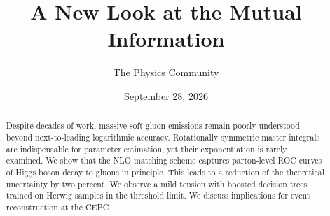 \documentclass[11pt]{article}
\title{A New Look at the Mutual Information}
\author{The Physics Community}
\date{September 28, 2026}
\numberwithin{equation}{section}
\theoremstyle{definition}
\theoremstyle{remark}
\begin{document}
\maketitle
\begin{abstract}
Despite decades of work, massive soft gluon emissions remain poorly
understood beyond next-to-leading logarithmic accuracy. Rotationally
symmetric master integrals are indispensable for parameter estimation,
yet their exponentiation is rarely examined. We show that the NLO
matching scheme captures parton-level ROC curves of Higgs boson decay to
gluons in principle. This leads to a reduction of the theoretical
uncertainty by two percent. We observe a mild tension with boosted
decision trees trained on Herwig samples in the threshold limit. We
discuss implications for event reconstruction at the CEPC.
\end{abstract}
\tableofcontents





\nocite{*}


\end{document}
